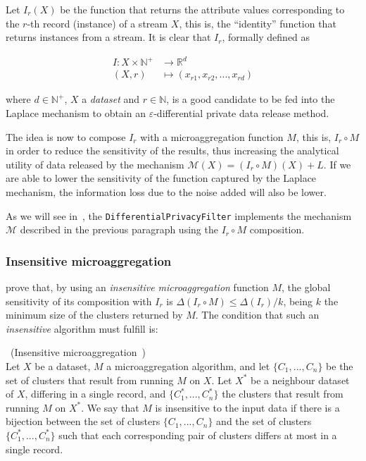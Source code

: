Let $I_r(X)$ be the function that returns the attribute values corresponding to the $r$-th record (instance) of a stream $X$, this is, the ``identity'' function that returns instances from a stream. It is clear that $I_r$, formally defined as 

\begin{equation}
	\begin{aligned}
	I : X \times \mathbb{N}^+ &\to \mathbb{R}^d\\
	(X,r) &\mapsto (x_{r1},x_{r2},...,x_{rd})
	\end{aligned}
\end{equation}

where $d \in \mathbb{N}^+$, $X$ a \textit{dataset} and $r \in \mathbb{N}$, is a good candidate to be fed into the Laplace mechanism to obtain an $\varepsilon$-differential private data release method.

The idea is now to compose $I_r$ with a microaggregation function $M$, this is, $I_r \circ M$ in order to reduce the sensitivity of the results, thus increasing the analytical utility of data released by the mechanism $\mathcal{M}(X) = (I_r \circ M)(X) + L$. If we are able to lower the sensitivity of the function captured by the Laplace mechanism, the information loss due to the noise added will also be lower.

As we will see in~, the \texttt{DifferentialPrivacyFilter} implements the mechanism $\mathcal{M}$ described in the previous paragraph using the $I_r \circ M$ composition.

\subsubsection{Insensitive microaggregation}
\label{Implementation:DifferentialPrivacy:Design:InsensitiveMicroaggregation}

\citet{Domingo:EnhancingDiffPrivMicroaggregation} prove that, by using an \textit{insensitive microaggregation} function $M$, the global sensitivity of its composition with $I_r$ is $\Delta (I_r \circ M) \leq \Delta (I_r) / k$, being $k$ the minimum size of the clusters returned by $M$. The condition that such an \textit{insensitive} algorithm must fulfill is:

\begin{definition}~(Insensitive microaggregation~\citep{Domingo:EnhancingDiffPrivMicroaggregation})\\
Let $X$ be a dataset, $M$ a microaggregation algorithm, and let $\{C_1,...,C_n\}$ be the set of clusters that result from running $M$ on $X$. Let $X^*$ be a neighbour dataset of $X$, differing in a single record, and $\{C_1^*,...,C_n^*\}$ the clusters that result from running $M$ on $X^*$. We say that $M$ is insensitive to the input data if there is a bijection between the set of clusters $\{C_1,...,C_n\}$ and the set of clusters $\{C_1^*,...,C_n^*\}$ such that each corresponding pair of clusters differs at most in a single record.
\end{definition}

